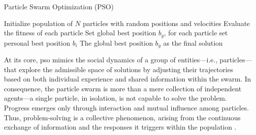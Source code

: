 {\begin{algorithm}[H]
\caption{Particle Swarm Optimization (PSO)}\label{alg:pso}
Initialize population of \(N\) particles with random positions and velocities\;
Evaluate the fitness of each particle\;
Set global best position \(b_g\), for each particle set personal best position \(b_i\)\;
\Return The global best position \(b_g\) as the final solution\;
\end{algorithm}

\vspace{.935em}

At its core, \acrshort{pso} mimics the social dynamics of a group of entities---i.e., particles---that explore the admissible space of solutions by adjusting their trajectories  based on both individual experience and shared information within the swarm. In consequence, the particle swarm is more than a mere collection of independent agents---a single particle, in isolation, is not capable to solve the problem. Progress emerges only through interaction and mutual influence among particles. Thus, problem-solving is a collective phenomenon, arising from the continuous exchange of information and the responses it triggers within the population \citep{poli2007particle}.



}

